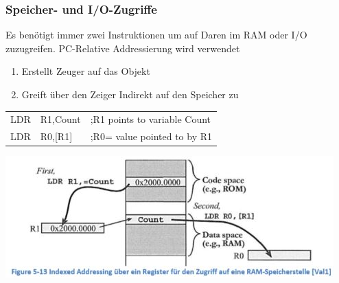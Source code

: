 \subsubsection{Speicher- und I/O-Zugriffe}
\begin{multicols}{2}
    \begin{minipage}{\linewidth}
    Es benötigt immer zwei Instruktionen um auf Daren im RAM oder I/O zuzugreifen.
    \rightarrow PC-Relative Addressierung wird verwendet
    \begin{enumerate}
        \item Erstellt Zeuger auf das Objekt
        \item Greift über den Zeiger Indirekt auf den Speicher zu
    \end{enumerate}
    \begin{tabular}{lll}
        LDR   &R1,Count   &;R1 points to variable Count\\ 
        LDR   &R0,[R1]    &;R0= value pointed to by R1\\ 
    \end{tabular} 
\end{minipage}

    \includegraphics[width=\linewidth]{images/AddressingRAM}   
\end{multicols}





















